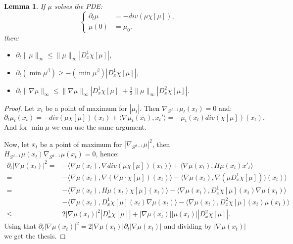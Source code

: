 \documentclass{article}
\numberwithin{theorem}{section}
\newtheorem{lemma}[theorem]{Lemma}
\begin{document}
\begin{lemma}
\label{lem:pde_bounds}
If $\mu$ solves the PDE:
    $$
    \begin{cases}
    \partial_t \mu &= -div(\mu \chi[\mu]),\\
    \mu(0)&=\mu_0.
    \end{cases}
    $$
then: 
\begin{itemize}
    \item $\partial_t \|\mu\|_{\infty} \leq  \|\mu\|_\infty  |D^1_x\chi[\mu]|$,
    \item $\partial_t \left(\min \mu^\beta \right) \geq  -\left(\min \mu^\beta \right)   |D^1_x\chi[\mu]|$,
    \item $\partial_t \|\nabla \mu\|_{\infty} \leq \|\nabla \mu\|_{\infty}  |D^1_x\chi[\mu]| +\frac{1}{2}\|\mu\|_{\infty}|D^2_x\chi[\mu]|$.
\end{itemize}
\end{lemma}
\begin{proof}
Let $x_t$ be a point of maximum for $|\mu_t|$. 
Then $\nabla_{S^{d-1}} \mu_t (x_t)=0$ and:
$$
    \partial_t \mu_t(x_t) = - div(\mu \chi[\mu])(x_t) + \langle\nabla \mu_t(x_t),x_t'\rangle = - \mu_t(x_t) div(\chi[\mu])(x_t).
$$
And for $\min \mu$ we can use the same argument. 

Now, let $x_t$ be a point of maximum  for $|\nabla_{S^{d-1}}\mu|^2$, then $H_{S^{d-1}}\mu(x_t) \nabla_{S^{d-1}}\mu(x_t)=0$, hence:
\begin{align*}
    \partial_t |\nabla \mu(x_t)|^2 =& - \langle \nabla \mu(x_t), \nabla div (\mu \chi[\mu])(x_t)\rangle +\langle \nabla \mu(x_t), H\mu(x_t) x'_t\rangle\\
    =& - \langle \nabla \mu(x_t), \nabla (\nabla \mu \cdot \chi[\mu])(x_t)\rangle-\langle \nabla \mu(x_t), \nabla (\mu D^1_x\chi[\mu]))(x_t)\rangle\\
    =&- \langle \nabla \mu(x_t), H\mu(x_t) \chi[\mu](x_t)\rangle-\langle \nabla \mu(x_t), D^1_x\chi[\mu](x_t) \nabla\mu(x_t) \rangle\\
    &-\langle \nabla \mu(x_t), D^1_x\chi[\mu] (x_t)\nabla \mu(x_t)\rangle- \langle \nabla \mu(x_t), D^2_x\chi[\mu] (x_t) \mu(x_t)\rangle\\
    \leq& 2|\nabla\mu(x_t)|^2 |D^1_x\chi[\mu]|+|\nabla \mu (x_t)||\mu(x_t)||D^2_x\chi[\mu]|.
\end{align*}
Using that $\partial_t |\nabla \mu(x_t)|^2=2|\nabla\mu(x_t)|\partial_t|\nabla\mu(x_t)|$ and dividing by $|\nabla \mu(x_t)|$ we get the thesis.
\end{proof}
\end{document}
